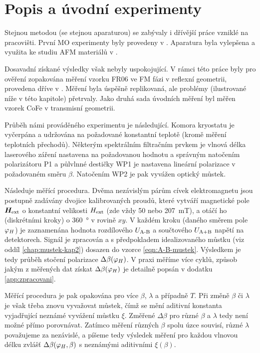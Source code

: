 \section{Popis a úvodní experimenty}
\label{chap:vychozi-situace}

Stejnou metodou (se stejnou aparaturou) se zabývaly i dřívější práce vzniklé na pracovišti.
První MO experimenty byly provedeny v \cite{wohlrathMagnetooptickaCharakterizaceSpintronickych2018}. 
Aparatura byla vylepšena a využita ke studiu AFM materiálů v \cite{kubascikMagnetooptickeStudiumAntiferomagnetickych2019,kimakOptickaSpektroskopieAntiferomagnetu2019}.

Dosavadní získané výsledky však nebyly uspokojující.
V rámci této práce byly pro ověření zopakována měření vzorku FR06 ve FM fázi v reflexní geometrii, provedena dříve v \cite{kubascikMagnetooptickeStudiumAntiferomagnetickych2019}.
Měření byla úspěšně replikovaná, ale problémy (ilustrované níže v této kapitole) přetrvaly.
Jako druhá sada úvodních měření byl měřen vzorek CoFe v transmisní geometrii.

Průběh námi prováděného experimentu je následující.
Komora kryostatu je vyčerpána a udržována na požadované konstantní teplotě (kromě měření teplotních přechodů).
Některým spektrálním filtračním prvkem je vlnová délka laserového záření nastavena na požadovanou hodnotu a správným natočením polarizátoru P1 a půlvlnné destičky WP1 je nastavena lineární polarizace v požadovaném směru $\beta$.
Natočením WP2 je pak vyvážen optický můstek.

Následuje měřící procedura. 
Dvěma nezávislým párům cívek elektromagnetu jsou postupně zadávány dvojice kalibrovaných proudů, které vytváří magnetické pole $\bm{H}_\textrm{ext}$ o konstantní velikosti $H_\textrm{ext}$ (zde vždy \num{50} nebo \SI{207}{\milli\tesla}), a otáčí ho (diskrétními kroky) o \SI{360}{\degree} v rovině $xy$.
V každém kroku (daného směrem pole $\varphi_H$) je zaznamenána hodnota rozdílového $U_\textrm{A-B}$ a součtového $U_\textrm{A+B}$ napětí na detektorech.
Signál je zpracován a s předpokladem idealizovaného můstku (viz oddíl \ref{chap:mustek-kap2}) dosazen do vzorce \eqref{eqn:A-B-mustek}.
Výsledkem je tedy průběh stočení polarizace $\Delta\beta(\varphi_H)$.
V praxi měříme více cyklů, způsob jakým z měřených dat získat $\Delta\beta(\varphi_H)$ je detailně popsán v dodatku \ref{app:zpracovani}.

Měřící procedura je pak opakována pro více $\beta$, $\lambda$ a případně $T$.
Při změně $\beta$ či $\lambda$ je však třeba znovu vyvažovat můstek, čímž se mění aditivní konstanta vyjadřující neznámé vyvážení můstku $\xi$.
Změřené $\Delta\beta$ pro různé $\beta$ a $\lambda$ tedy není možné přímo porovnávat.
Zatímco měření různých $\beta$ spolu úzce souvisí, různé $\lambda$ považujeme za nezávislé, a píšeme tedy výsledek měření pro každou vlnovou délku zvlášť $\Delta\beta(\varphi_H, \beta)$ s neznámými aditivními $\xi(\beta)$.


